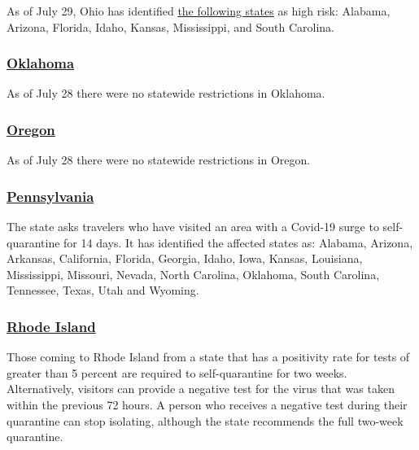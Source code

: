 As of July 29, Ohio has identified
\href{https://coronavirus.ohio.gov/wps/portal/gov/covid-19/families-and-individuals/COVID-19-Travel-Advisory/COVID-19-Travel-Advisory}{the
following states} as high risk: Alabama, Arizona, Florida, Idaho,
Kansas, Mississippi, and South Carolina.

\hypertarget{oklahoma}{%
\subsubsection{\texorpdfstring{\href{https://coronavirus.health.ok.gov/travel}{Oklahoma}}{Oklahoma}}\label{oklahoma}}

As of July 28 there were no statewide restrictions in Oklahoma.

\hypertarget{oregon}{%
\subsubsection{\texorpdfstring{\href{https://traveloregon.com/travel-alerts/}{Oregon}}{Oregon}}\label{oregon}}

As of July 28 there were no statewide restrictions in Oregon.

\hypertarget{pennsylvania}{%
\subsubsection{\texorpdfstring{\href{https://www.health.pa.gov/topics/disease/coronavirus/Pages/Travelers.aspx}{Pennsylvania}}{Pennsylvania}}\label{pennsylvania}}

The state asks travelers who have visited an area with a Covid-19 surge
to self-quarantine for 14 days. It has identified the affected states
as: Alabama, Arizona, Arkansas, California, Florida, Georgia, Idaho,
Iowa, Kansas, Louisiana, Mississippi, Missouri, Nevada, North Carolina,
Oklahoma, South Carolina, Tennessee, Texas, Utah and Wyoming.

\hypertarget{rhode-island}{%
\subsubsection{\texorpdfstring{\href{https://health.ri.gov/covid/}{Rhode
Island}}{Rhode Island}}\label{rhode-island}}

Those coming to Rhode Island from a state that has a positivity rate for
tests of greater than 5 percent are required to self-quarantine for two
weeks. Alternatively, visitors can provide a negative test for the virus
that was taken within the previous 72 hours. A person who receives a
negative test during their quarantine can stop isolating, although the
state recommends the full two-week quarantine.

